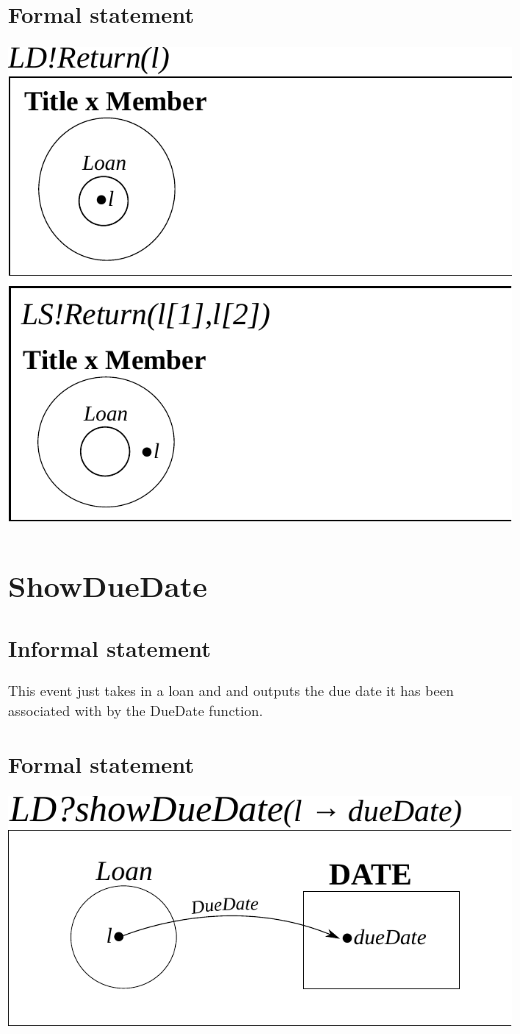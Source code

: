 \documentclass[]{report}
\begin{document}
\subsection{Formal statement}
\begin{center}
	\includegraphics{return.pdf}
\end{center}
\newpage
\section{ShowDueDate}
\subsection{Informal statement}
This event just takes in a loan and and outputs the due date it has been associated with by the DueDate function.
\subsection{Formal statement}
\begin{center}
	\includegraphics{show_due_date.pdf}
\end{center}
\newpage
\end{document}
